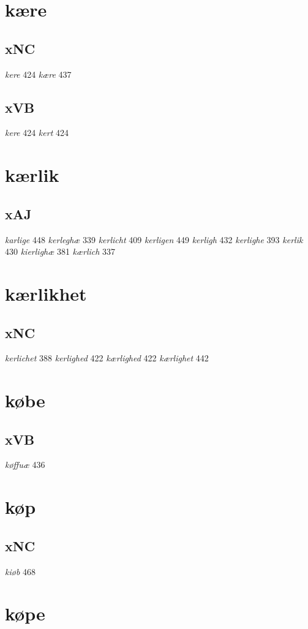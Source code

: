 \documentclass[a4paper,twocolumn]{article}
\begin{document}
\section{kære}
\label{sec:orgd87b561}
\subsection{xNC}
\label{sec:org6ec364c}
\emph{kere} 424 \emph{kære} 437 
\subsection{xVB}
\label{sec:org1a5dfac}
\emph{kere} 424 \emph{kert} 424 
\section{kærlik}
\label{sec:orgf5bbd2a}
\subsection{xAJ}
\label{sec:orge0a216a}
\emph{karlige} 448 \emph{kerleghæ} 339 \emph{kerlicht} 409 \emph{kerligen} 449 \emph{kerligh} 432 \emph{kerlighe} 393 \emph{kerlik} 430 \emph{kierlighæ} 381 \emph{kærlich} 337 
\section{kærlikhet}
\label{sec:orgbafd20d}
\subsection{xNC}
\label{sec:orga61c96e}
\emph{kerlichet} 388 \emph{kerlighed} 422 \emph{kærlighed} 422 \emph{kærlighet} 442 
\section{købe}
\label{sec:org6f5e4cc}
\subsection{xVB}
\label{sec:org247a36b}
\emph{køffuæ} 436 
\section{køp}
\label{sec:orgca2bbab}
\subsection{xNC}
\label{sec:org7e7f22d}
\emph{kiøb} 468 
\section{køpe}
\label{sec:orgb525188}
\end{document}
